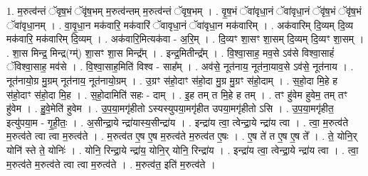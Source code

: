 \documentclass[17pt]{extarticle}
\begin{document}
1. म॒रुत्व॑न्तं ॅवृष॒भं ॅवृ॑ष॒भम् म॒रुत्व॑न्तम् म॒रुत्व॑न्तं ॅवृष॒भम् । . वृ॒ष॒भं ॅवा॑वृधा॒नं ॅवा॑वृधा॒नं ॅवृ॑ष॒भं ॅवृ॑ष॒भं ॅवा॑वृधा॒नम् । . वा॒वृ॒धा॒न मक॑वारि॒ मक॑वारिं ॅवावृधा॒नं ॅवा॑वृधा॒न मक॑वारिम् । . अक॑वारिम् दि॒व्यम् दि॒व्य मक॑वारि॒ मक॑वारिम् दि॒व्यम् । . अक॑वारि॒मित्यक॑वा - अ॒रि॒म् । . दि॒व्यꣳ शा॒सꣳ शा॒सम् दि॒व्यम् दि॒व्यꣳ शा॒सम् । . शा॒स मिन्द्र॒ मिन्द्र(ग्म्॑) शा॒सꣳ शा॒स मिन्द्र᳚म् । . इन्द्र॒मितीन्द्र᳚म् । . वि॒श्वा॒साह॒ मव॒से ऽव॑से विश्वा॒साहं॑ ॅविश्वा॒साह॒ मव॑से । . वि॒श्वा॒साह॒मिति॑ विश्व - साह᳚म् । . अव॑से॒ नूत॑नाय॒ नूत॑ना॒याव॒से ऽव॑से॒ नूत॑नाय । . नूत॑नायो॒ग्र मु॒ग्रम् नूत॑नाय॒ नूत॑नायो॒ग्रम् । . उ॒ग्रꣳ स॑हो॒दाꣳ स॑हो॒दा मु॒ग्र मु॒ग्रꣳ स॑हो॒दाम् । . स॒हो॒दा मि॒हे ह स॑हो॒दाꣳ स॑हो॒दा मि॒ह । . स॒हो॒दामिति॑ सहः - दाम् । . इ॒ह तम् त मि॒हे ह तम् । . तꣳ हु॑वेम हुवेम॒ तम् तꣳ हु॑वेम । . हु॒वे॒मेति॑ हुवेम । . उ॒प॒या॒मगृ॑हीतो ऽस्यस्युपया॒मगृ॑हीत उपया॒मगृ॑हीतो ऽसि । . उ॒प॒या॒मगृ॑हीत॒ इत्यु॑पया॒म - गृ॒ही॒तः॒ । . अ॒सीन्द्रा॒ये न्द्रा॑यास्य॒सीन्द्रा॑य । . इन्द्रा॑य त्वा॒ त्वेन्द्रा॒ये न्द्रा॑य त्वा । . त्वा॒ म॒रुत्व॑ते म॒रुत्व॑ते त्वा त्वा म॒रुत्व॑ते । . म॒रुत्व॑त ए॒ष ए॒ष म॒रुत्व॑ते म॒रुत्व॑त ए॒षः । . ए॒ष ते॑ त ए॒ष ए॒ष ते᳚ । . ते॒ योनि॒र् योनि॑ स्ते ते॒ योनिः॑ । . योनि॒ रिन्द्रा॒ये न्द्रा॑य॒ योनि॒र् योनि॒ रिन्द्रा॑य । . इन्द्रा॑य त्वा॒ त्वेन्द्रा॒ये न्द्रा॑य त्वा । . त्वा॒ म॒रुत्व॑ते म॒रुत्व॑ते त्वा त्वा म॒रुत्व॑ते । . म॒रुत्व॑त॒ इति॑ म॒रुत्व॑ते । \newline
\end{document}
